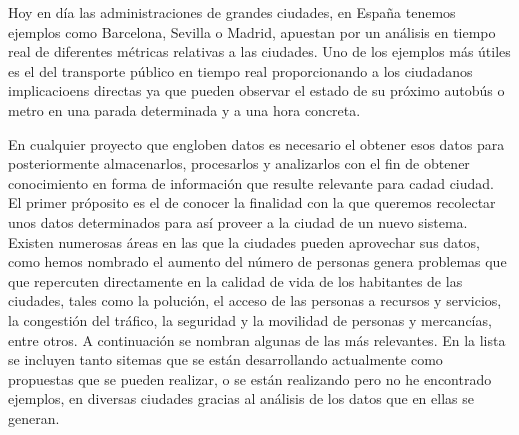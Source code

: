  Hoy en día las administraciones de grandes ciudades, en España tenemos ejemplos como Barcelona, Sevilla o Madrid, apuestan por un análisis en tiempo real de diferentes métricas relativas a las ciudades. Uno de los ejemplos más útiles es el del transporte público en tiempo real proporcionando a los ciudadanos implicacioens directas ya que pueden observar el estado de su próximo autobús o metro en una parada determinada y a una hora concreta. 
 
 En cualquier proyecto que engloben datos es necesario el obtener esos datos para posteriormente almacenarlos, procesarlos y analizarlos con el fin de obtener conocimiento en forma de información que resulte relevante para cadad ciudad. El primer próposito es el de conocer la finalidad con la que queremos recolectar unos datos determinados para así proveer a la ciudad de un nuevo sistema. Existen numerosas áreas en las que la ciudades pueden aprovechar sus datos, como hemos nombrado el aumento del número de personas genera problemas que que repercuten directamente en la calidad de vida de los habitantes de las ciudades, tales como la polución, el acceso de las personas a recursos y servicios, la congestión del tráfico, la seguridad y la movilidad de personas y mercancías, entre otros. A continuación se nombran algunas de las más relevantes. En la lista se incluyen tanto sitemas que se están desarrollando actualmente como propuestas que se pueden realizar, o se están realizando pero no he encontrado ejemplos, en diversas ciudades gracias al análisis de los datos que en ellas se generan.
 
